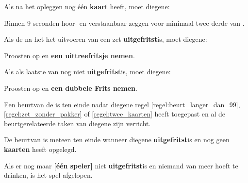 \newpage
{}
\label{sec:beurten_en_zetten_einde}


\vervolgLijst{}
\item Als \eenSpeler na het opleggen nog \'e\'en \textbf{kaart} heeft, moet diegene:
\puntLijst{}
\item Binnen 9 seconden hoor- en verstaanbaar  zeggen voor minimaal twee derde van \alleSpelersN.
\eindPuntLijst{}
\label{regel:laatste_frits_1}
\eindLijst{}

\vervolgLijst{}
\item Als de \huidigeSpeler na het het uitvoeren van een zet \textbf{uitgefritst}\footnotemark[1] is, moet diegene:
\puntLijst{}
\item Proosten op  en \textbf{een uittreefritsje nemen}\footnotemark[2].
\eindPuntLijst{}
\label{regel:laatste_frits_2}
\eindLijst{}

\vervolgLijst{}
\item Als \eenSpeler als laatste van \alleSpelers nog niet \textbf{uitgefritst}\footnotemark[1] is, moet diegene:
\puntLijst{}
\item Proosten op  en \textbf{een dubbele Frits nemen}\footnotemark[3].
\eindPuntLijst{}
\eindLijst{}


\vervolgLijst{}
\item Een beurt\footnotemark[4] van de \huidigeSpeler is ten einde nadat diegene regel \ref{regel:beurt_langer_dan_99}, \ref{regel:zet_zonder_pakker} of \ref{regel:twee_kaarten} heeft toegepast en al de beurtgerelateerde taken van diegene zijn verricht.
\eindLijst{}

\vervolgLijst{}
\item De beurt\footnotemark[4] van \eenSpeler is meteen ten einde wanneer diegene \textbf{uitgefritst}\footnotemark[1] is en nog geen \textbf{kaarten} heeft opgelegd.
\eindLijst{}

\vervolgLijst{}
\item Als er nog maar \textbf{[\'e\'en speler]} niet \textbf{uitgefritst}\footnotemark[1] is en niemand van \alleSpelers meer hoeft te drinken, is het spel afgelopen.
\eindLijst{}

